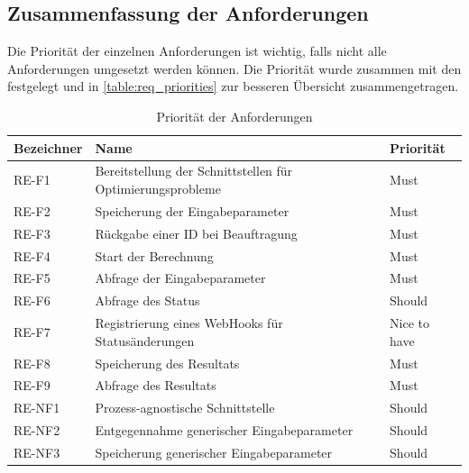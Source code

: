 \subsection{Zusammenfassung der Anforderungen}\label{toc_anfoderungen}
Die Priorität der einzelnen Anforderungen ist wichtig, falls nicht alle Anforderungen umgesetzt werden können. Die Priorität wurde zusammen mit den  
festgelegt und in \autoref{table:req_priorities} zur besseren Übersicht zusammengetragen.
\begin{table}[ht]
\centering
  \begin{tabular}{ l | l | l }
	\hline
	\rowcolor{gray}
	\textbf{Bezeichner}	& \textbf{Name}	&	\textbf{Priorität}\\ \hline
	RE-F1 			&  Bereitstellung der Schnittstellen für Optimierungsprobleme	& Must\\ \hline
	RE-F2 			&  Speicherung der Eingabeparameter	& Must\\ \hline
	RE-F3 			&  Rückgabe einer ID bei Beauftragung	& Must\\ \hline
	RE-F4 			&  Start der Berechnung	& Must\\ \hline
	RE-F5 			&  Abfrage der Eingabeparameter	& Must\\ \hline
	RE-F6 			&  Abfrage des Status	& Should\\ \hline
	RE-F7 			&  Registrierung eines WebHooks für Statusänderungen	& Nice to have\\ \hline
	RE-F8 			&  Speicherung des Resultats	& Must\\ \hline
	RE-F9 			&  Abfrage des Resultats	& Must\\ \hline
	RE-NF1 			&  Prozess-agnostische Schnittstelle & Should\\ \hline
	RE-NF2 			&  Entgegennahme generischer Eingabeparameter & Should\\ \hline
	RE-NF3 			&  Speicherung generischer Eingabeparameter & Should\\ \hline
  \end{tabular}
   \caption{Priorität der Anforderungen}\label{table:req_priorities}
\end{table}